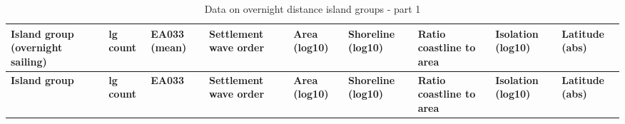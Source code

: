 \documentclass[draft,10pt]{article} %
\begin{document}
\begin{landscape}
\begin{longtable}{| p{2.6cm} |  p{1cm} | p{1.2cm}  | p{1.9cm}  | p{1.7cm}  | p{1.7cm}  | p{1.7cm}  | p{1.6cm} | p{1.5cm}   |}
\caption{{Data on overnight distance island groups - part 1}} 
\label{overnight_groups_table} \\

\hline
\textbf{Island group (overnight sailing)} & \textbf{lg  count } & \textbf{EA033 (mean)} & \textbf{Settlement wave order} & \textbf{Area (log10)} & \textbf{Shoreline (log10)} & \textbf{Ratio coastline to  area} & \textbf{Isolation (log10)} & \textbf{Latitude (abs)}  \\ \hline

\endfirsthead

\hline
\textbf{Island group} & \textbf{lg  count } & \textbf{EA033} & \textbf{Settlement wave order} & \textbf{Area (log10)} & \textbf{Shoreline (log10)} & \textbf{Ratio coastline to  area} & \textbf{Isolation (log10)} & \textbf{Latitude (abs)}  \\ \hline
\endhead


\end{longtable}
\end{landscape}
\end{document}
